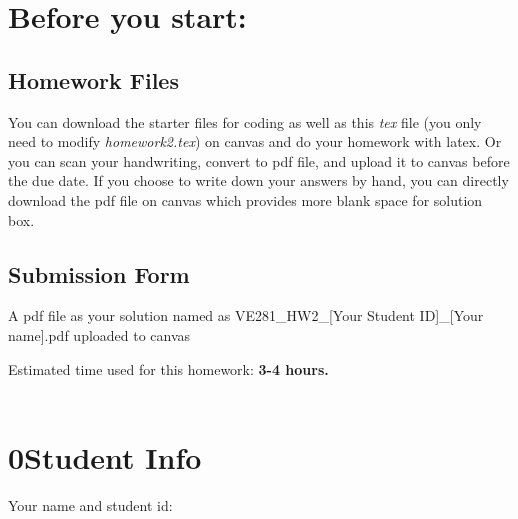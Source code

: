 \documentclass[11pt]{exam}
\begin{document}
\setlength{\parindent}{0pt}
\section*{Before you start:}

\subsection*{Homework Files}
You can download the starter files for coding as well as this \textit{tex} file (you only need to modify \textit{homework2.tex}) on canvas and do your homework with latex. Or you can scan your handwriting, convert to pdf file, and upload it to canvas before the due date. If you choose to write down your answers by hand, you can directly download the pdf file on canvas which provides more blank space for solution box.\\

\subsection*{Submission Form}
A pdf file as your solution named as VE281\_HW2\_[Your Student ID]\_[Your name].pdf uploaded to canvas


Estimated time used for this homework: \textbf{3-4 hours.}
\\\\


\newpage
\section*{0\quad Student Info}
Your name and student id:
\begin{solution}
\end{solution}
\end{document}
